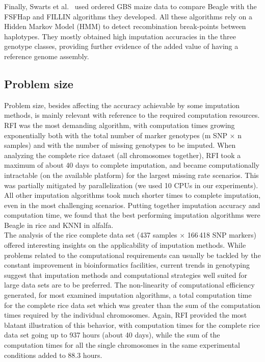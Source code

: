 Finally, Swarts et al.~\cite{swarts_novel_2014} used ordered GBS maize data to compare Beagle with the FSFHap and FILLIN algorithms they developed. All these algorithms rely on a Hidden Markov Model (HMM) to detect recombination break-points between haplotypes. They mostly obtained high imputation accuracies in the three genotype classes, providing further evidence of the added value of having a reference genome assembly.

\subsection{Problem size}
\label{sec:size_of_problem}
Problem size, besides affecting the accuracy achievable by some imputation methods, is mainly relevant with reference to the required computation resources. RFI was the most demanding algorithm, with computation times growing exponentially both with the total number of marker genotypes (m SNP $\times$ n samples) and with the number of missing genotypes to be imputed. When analyzing the complete rice dataset (all chromosomes together), RFI took a maximum of about 40 days to complete imputation, and became computationally intractable (on the available platform) for the largest missing rate scenarios. This was partially mitigated by parallelization (we used 10 CPUs in our experiments). All other imputation algorithms took much shorter times to complete imputation, even in the most challenging scenarios. Putting together imputation accuracy and computation time, we found that the best performing imputation algorithms were Beagle in rice and KNNI in alfalfa.\\
The analysis of the rice complete data set (437 samples $\times$ 166\,418 SNP markers) offered interesting insights on the applicability of imputation methods. While problems related to the computational requirements can usually be tackled by the constant improvement in bioinformatics facilities, current trends in genotyping suggest that imputation methods and computational strategies well suited for large data sets are to be preferred. The non-linearity of computational efficiency generated, for most examined imputation algorithms, a total computation time for the complete rice data set which was greater than the sum of the computation times required by the individual chromosomes. Again, RFI provided the most blatant illustration of this behavior, with computation times for the complete rice data set going up to 937 hours (about 40 days), while the sum of the computation times for all the single chromosomes in the same experimental conditions added to 88.3 hours.

